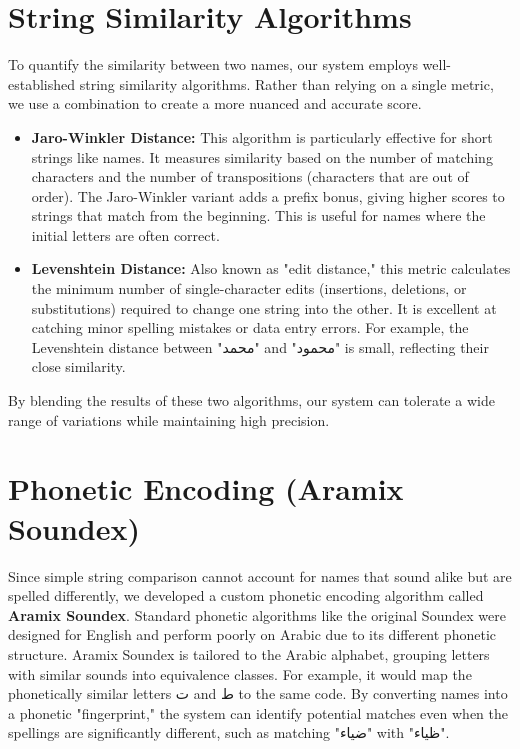 \section{String Similarity Algorithms}
To quantify the similarity between two names, our system employs well-established string similarity algorithms. Rather than relying on a single metric, we use a combination to create a more nuanced and accurate score.
\begin{itemize}
    \item \textbf{Jaro-Winkler Distance:} This algorithm is particularly effective for short strings like names. It measures similarity based on the number of matching characters and the number of transpositions (characters that are out of order). The Jaro-Winkler variant adds a prefix bonus, giving higher scores to strings that match from the beginning. This is useful for names where the initial letters are often correct.
    \item \textbf{Levenshtein Distance:} Also known as "edit distance," this metric calculates the minimum number of single-character edits (insertions, deletions, or substitutions) required to change one string into the other. It is excellent at catching minor spelling mistakes or data entry errors. For example, the Levenshtein distance between "\textarabic{محمد}" and "\textarabic{محمود}" is small, reflecting their close similarity.
\end{itemize}
By blending the results of these two algorithms, our system can tolerate a wide range of variations while maintaining high precision.

\section{Phonetic Encoding (Aramix Soundex)}
Since simple string comparison cannot account for names that sound alike but are spelled differently, we developed a custom phonetic encoding algorithm called \textbf{Aramix Soundex}. Standard phonetic algorithms like the original Soundex were designed for English and perform poorly on Arabic due to its different phonetic structure.
Aramix Soundex is tailored to the Arabic alphabet, grouping letters with similar sounds into equivalence classes. For example, it would map the phonetically similar letters \textarabic{ت} and \textarabic{ط} to the same code. By converting names into a phonetic "fingerprint," the system can identify potential matches even when the spellings are significantly different, such as matching "\textarabic{ضياء}" with "\textarabic{ظياء}".

